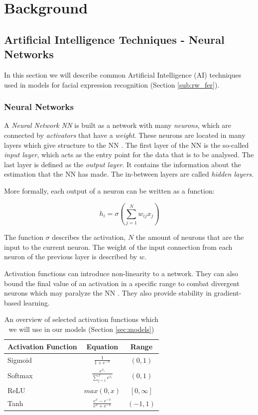 \section{Background}
\label{sec:related}

\subsection{Artificial Intelligence Techniques - Neural Networks}
\label{sub:aiml}
In this section we will describe common Artificial Intelligence (AI) techniques used in models for  facial expression recognition (Section \ref{sub:rw_fer}).
\subsubsection{Neural Networks}
A \emph{Neural Network NN} is built as a network with many \emph{neurons}, which are connected by \emph{activators} that have a \emph{weight}. These neurons are located in many layers which give structure to the NN \cite{schmidhuber2015deep}. The first layer of the NN is the so-called \emph{input layer}, which acts as the entry point for the data that is to be analysed. The last layer is defined as the \emph{output layer}. It contains the information about the estimation that the NN has made. The in-between layers are called \emph{hidden layers}.

More formally, each output of a neuron can be written as a function:

\begin{equation}
    h_i = \sigma (\sum_{j=1}^{N} w_{ij}x_{j})
\end{equation}

The function $\sigma$ describes the activation, $N$ the amount of neurons that are the input to the current neuron. The weight of the input connection from each neuron of the previous layer is described by $w$.

Activation functions can introduce non-linearity to a network. They can also bound the final value of an activation in a specific range to combat divergent neurons which may paralyze the NN \cite{wang2003artificial}. They also provide stability in gradient-based learning.
\bgroup
\def\arraystretch{2}
\begin{table}
    \centering
    \begin{tabular}{l|c|c}
        \textbf{Activation Function} & \textbf{Equation} & \textbf{Range} \\ \hline \hline
         Sigmoid & $\frac{1}{1 + e^{-x}}$ &  $(0,1)$\\\hline
         Softmax & $\frac{e^{x_i}}{\sum_{j=1}^{J} e^{x_i}}$ & $(0,1)$\\\hline
         ReLU & $max(0, x)$ & $[0, \infty]$ \\\hline
         Tanh & $\frac{e^x - e^{-x}}{e^x + e^{-x}}$ & $(-1, 1)$\\\hline
    \end{tabular}
    \caption{An overview of selected activation functions which we will use in our models (Section \ref{sec:models})}
    \label{tab:my_label}
\end{table}
\egroup

